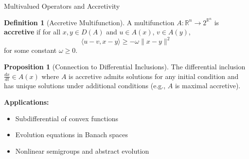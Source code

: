 \documentclass[aspectratio=169,10pt]{beamer}
\theoremstyle{definition}
\newtheorem{defn}{Definition}[section]
\newtheorem{prop}{Proposition}[section]
\begin{document}
\begin{frame}{Multivalued Operators and Accretivity}

\begin{defn}[Accretive Multifunction]
A multifunction $A: \mathbb{R}^n \to 2^{\mathbb{R}^n}$ is \textbf{accretive} if for all $x, y \in D(A)$ and $u \in A(x)$, $v \in A(y)$,
\[
\langle u - v, x - y \rangle \geq -\omega \|x - y\|^2
\]
for some constant $\omega \geq 0$.
\end{defn}

\vspace{0.3cm}

\begin{prop}[Connection to Differential Inclusions]
The differential inclusion $\frac{dx}{dt} \in A(x)$ where $A$ is accretive admits solutions for any initial condition and has unique solutions under additional conditions (e.g., $A$ is maximal accretive).
\end{prop}

\vspace{0.3cm}

\textbf{Applications:}
\begin{itemize}
    \item Subdifferential of convex functions
    \item Evolution equations in Banach spaces
    \item Nonlinear semigroups and abstract evolution
\end{itemize}

\end{frame}
\end{document}
